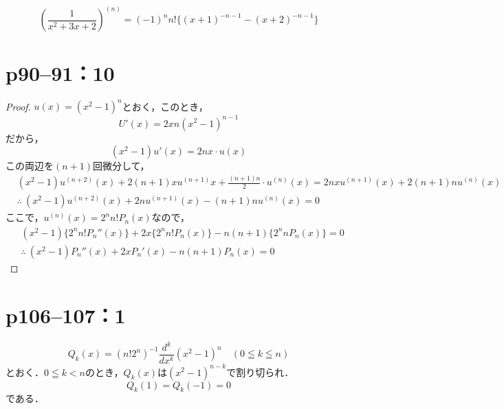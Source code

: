 \documentclass[a4paper,10pt,fleqn]{ltjsarticle}
\begin{document}
\begin{tleftbar}
    \[
        \left(   \frac{1}{x^2+3x+2} \right)^{(n)} = (-1)^n n! \{ (x+1)^{-n-1} - (x+2)^{-n-1} \}
    \]
\end{tleftbar}



\section*{p90--91：10}

\begin{tleftbar}
    \begin{proof}
        $u(x)= (x^2-1)^n$とおく，このとき，
        \[
            U'(x)= 2x n(x^2-1)^{n-1}
        \]
        だから，
        \[
            (x^2-1) u'(x)=2nx \cdot u(x)
        \]
        この両辺を$(n+1)$回微分して，
        \begin{align*}
             & (x^2-1)u^{(n+2)}(x)+2(n+1)x u^{(n+1)} x + \frac{(n+1)n}{2} \cdot u^{(n)} (x) = 2nx u^{(n+1)}(x) + 2(n+1) n u^{(n)}(x) \\
             & \therefore ~(x^2-1)u^{(n+2)}(x) + 2n u^{(n+1)}(x)-(n+1)n u^{(n)}(x)=0
        \end{align*}
        ここで，$ u^{(n)} (x)= 2^n n! P_n (x)$なので，
        \begin{align*}
             & (x^2 -1) \{ 2^n n! P_n ''(x) \} +2x \{ 2^n n! P_n (x) \} -n(n+1) \{ 2^n n P_n(x) \} =0 \\
             & \therefore ~ (x^2-1) P_n ''(x)+2x P_n '(x) -n(n+1) P_n (x)=0
        \end{align*}
    \end{proof}
\end{tleftbar}

\newpage
\section*{p106--107：1}


\[
    Q_k (x)= (n! 2^n)^{-1} \frac{d^k}{dx^k} (x^2-1)^n \quad (0 \leqq k \leqq n)
\]
とおく．$0 \leqq k <n$のとき，$Q_k (x)$は$(x^2-1)^{n-k}$で割り切られ．
\[
    Q_k (1)= Q_k(-1)=0
\]
である．
\end{document}

